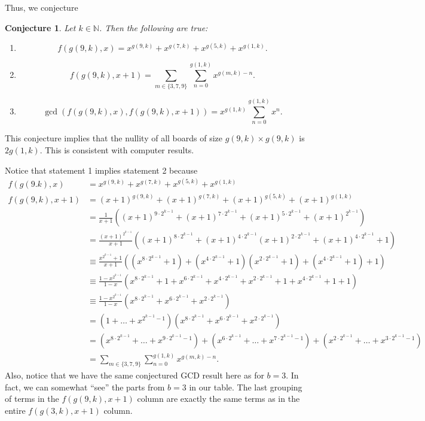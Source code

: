 \documentclass{article}
\newtheorem{conjecture}{Conjecture}
\newcommand{\N}{\mathbb{N}}
\begin{document}
	Thus, we conjecture
	\begin{conjecture}
		Let $k \in \N$.
		Then the following are true:
		\begin{enumerate}
			\item
			\begin{equation*}
				f(g(9,k),x) = x^{g(9,k)} + x^{g(7,k)} + x^{g(5,k)} + x^{g(1,k)}.
			\end{equation*}
			\item
			\begin{equation*}
				f(g(9,k),x+1) = \sum_{m\in\{3,7,9\}}{\sum_{n=0}^{g(1,k)}{x^{g(m,k)-n}}}.
			\end{equation*}
			\item
			\begin{equation*}
				\gcd\left(f(g(9,k),x),f(g(9,k),x+1)\right) = x^{g(1,k)}\sum_{n=0}^{g(1,k)}{x^n}.
			\end{equation*}
		\end{enumerate}
	\end{conjecture}
	This conjecture implies that the nullity of all boards of size $g(9,k) \times g(9,k)$ is $2g(1,k)$.
	This is consistent with computer results.
	
	Notice that statement 1 implies statement 2 because
	\begin{align*}
		f(g(9.k),x) &= x^{g(9,k)} + x^{g(7,k)} + x^{g(5,k)} + x^{g(1,k)} \\
		f(g(9,k),x+1) &= (x+1)^{g(9,k)} + (x+1)^{g(7,k)} + (x+1)^{g(5,k)} + (x+1)^{g(1,k)} \\
		&= \frac{1}{x+1}\left((x+1)^{9\cdot2^{k-1}} + (x+1)^{7\cdot2^{k-1}} + (x+1)^{5\cdot2^{k-1}} + (x+1)^{2^{k-1}}\right) \\
		&= \frac{(x+1)^{2^{k-1}}}{x+1}\left((x+1)^{8\cdot2^{k-1}} + (x+1)^{4\cdot2^{k-1}}(x+1)^{2\cdot2^{k-1}} + (x+1)^{4\cdot2^{k-1}} + 1\right) \\
		&\equiv \frac{x^{2^{k-1}}+1}{x+1}\left(\left(x^{8\cdot2^{k-1}}+1\right) + \left(x^{4\cdot2^{k-1}}+1\right)\left(x^{2\cdot2^{k-1}}+1\right) + \left(x^{4\cdot2^{k-1}}+1\right) + 1\right) \\
		&\equiv \frac{1-x^{2^{k-1}}}{1-x}\left(x^{8\cdot2^{k-1}} + 1 + x^{6\cdot2^{k-1}} + x^{4\cdot2^{k-1}} + x^{2\cdot2^{k-1}} + 1 + x^{4\cdot2^{k-1}} + 1 + 1\right) \\
		&\equiv \frac{1-x^{2^{k-1}}}{1-x}\left(x^{8\cdot2^{k-1}}+x^{6\cdot2^{k-1}}+x^{2\cdot2^{k-1}}\right) \\
		&= \left(1+\dots+x^{2^{k-1}-1}\right)\left(x^{8\cdot2^{k-1}}+x^{6\cdot2^{k-1}}+x^{2\cdot2^{k-1}}\right) \\
		&= \left(x^{8\cdot2^{k-1}}+\dots+x^{9\cdot2^{k-1}-1}\right) + \left(x^{6\cdot2^{k-1}}+\dots+x^{7\cdot2^{k-1}-1}\right) + \left(x^{2\cdot2^{k-1}}+\dots+x^{3\cdot2^{k-1}-1}\right) \\
		&= \sum_{m\in\{3,7,9\}}{\sum_{n=0}^{g(1,k)}{x^{g(m,k)-n}}}.
	\end{align*}
	Also, notice that we have the same conjectured GCD result here as for $b=3$.
	In fact, we can somewhat ``see'' the parts from $b=3$ in our table.
	The last grouping of terms in the $f(g(9,k),x+1)$ column are exactly the same terms as in the entire $f(g(3,k),x+1)$ column.
\end{document}
